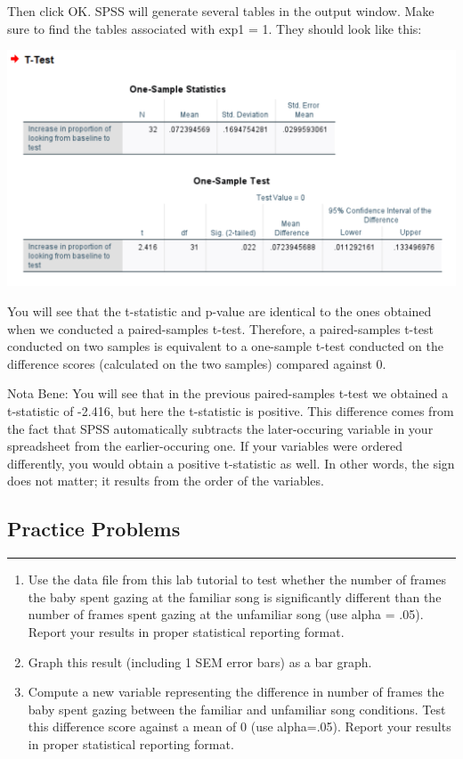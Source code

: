 \documentclass[]{book}
\begin{document}
Then click {OK}. SPSS will generate several tables in the output window.
Make sure to find the tables associated with exp1 = 1. They should look
like this:

\includegraphics{img/6.4.33.png}

You will see that the t-statistic and p-value are identical to the ones
obtained when we conducted a paired-samples t-test. Therefore, a
paired-samples t-test conducted on two samples is equivalent to a
one-sample t-test conducted on the difference scores (calculated on the
two samples) compared against 0.

Nota Bene: You will see that in the previous paired-samples t-test we
obtained a t-statistic of -2.416, but here the t-statistic is positive.
This difference comes from the fact that SPSS automatically subtracts
the later-occuring variable in your spreadsheet from the
earlier-occuring one. If your variables were ordered differently, you
would obtain a positive t-statistic as well. In other words, the sign
does not matter; it results from the order of the variables.

\subsection{Practice Problems}\label{practice-problems-5}

\begin{center}\rule{0.5\linewidth}{0.5pt}\end{center}

\begin{enumerate}
\def\labelenumi{\arabic{enumi}.}
\item
  Use the data file from this lab tutorial to test whether the number of
  frames the baby spent gazing at the familiar song is significantly
  different than the number of frames spent gazing at the unfamiliar
  song (use alpha = .05). Report your results in proper statistical
  reporting format.
\item
  Graph this result (including 1 SEM error bars) as a bar graph.
\item
  Compute a new variable representing the difference in number of frames
  the baby spent gazing between the familiar and unfamiliar song
  conditions. Test this difference score against a mean of 0 (use
  alpha=.05). Report your results in proper statistical reporting
  format.
\end{enumerate}
\end{document}
